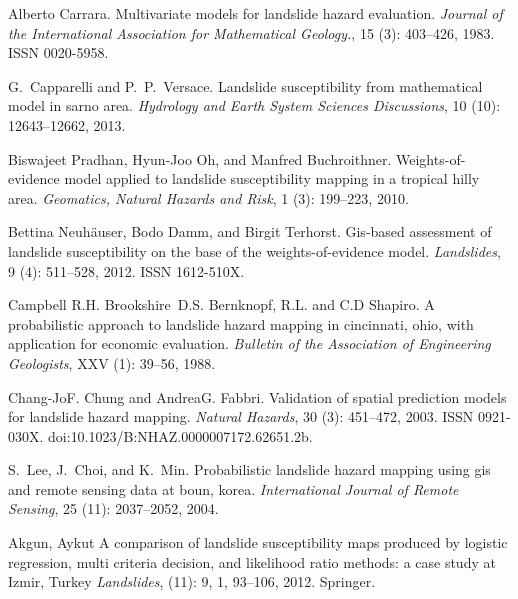 \documentclass[11pt,twoside]{rmta2010esp}%
\begin{document}
\begin{thebibliography}{99}
Alberto Carrara.
\newblock Multivariate models for landslide hazard evaluation.
\newblock \emph{Journal of the International Association for Mathematical
  Geology.}, 15 (3): 403--426, 1983.
\newblock ISSN 0020-5958.


G.~Capparelli and P.~P.~Versace.
\newblock Landslide susceptibility from mathematical model in sarno area.
\newblock \emph{Hydrology and Earth System Sciences Discussions}, 10
  (10): 12643--12662, 2013.


Biswajeet Pradhan, Hyun-Joo Oh, and Manfred Buchroithner.
\newblock Weights-of-evidence model applied to landslide susceptibility mapping
  in a tropical hilly area.
\newblock \emph{Geomatics, Natural Hazards and Risk}, 1 (3):
  199--223, 2010.
  
  
Bettina Neuh\"auser, Bodo Damm, and Birgit Terhorst.
\newblock Gis-based assessment of landslide susceptibility on the base of the
  weights-of-evidence model.
\newblock \emph{Landslides}, 9 (4): 511--528, 2012.
\newblock ISSN 1612-510X.


Campbell R.H. Brookshire~D.S. Bernknopf, R.L. and C.D Shapiro.
\newblock A probabilistic approach to landslide hazard mapping in cincinnati,
  ohio, with application for economic evaluation.
\newblock \emph{Bulletin of the Association of Engineering Geologists},
  XXV (1): 39--56, 1988.
  
  
Chang-JoF. Chung and AndreaG. Fabbri.
\newblock Validation of spatial prediction models for landslide hazard mapping.
\newblock \emph{Natural Hazards}, 30 (3): 451--472, 2003.
\newblock ISSN 0921-030X.
\newblock doi:{10.1023/B:NHAZ.0000007172.62651.2b}.

S.~Lee, J.~Choi, and K.~Min.
\newblock Probabilistic landslide hazard mapping using gis and remote sensing
  data at boun, korea.
\newblock \emph{International Journal of Remote Sensing}, 25
  (11): 2037--2052, 2004.
  
  
  
Akgun, Aykut
\newblock A comparison of landslide susceptibility maps produced by logistic regression, multi criteria decision, and likelihood ratio methods: a case study at Izmir, Turkey
\newblock \emph{Landslides},
  (11): 9, 1, 93--106, 2012.
\newblock Springer. 



\end{thebibliography}
\end{document}

